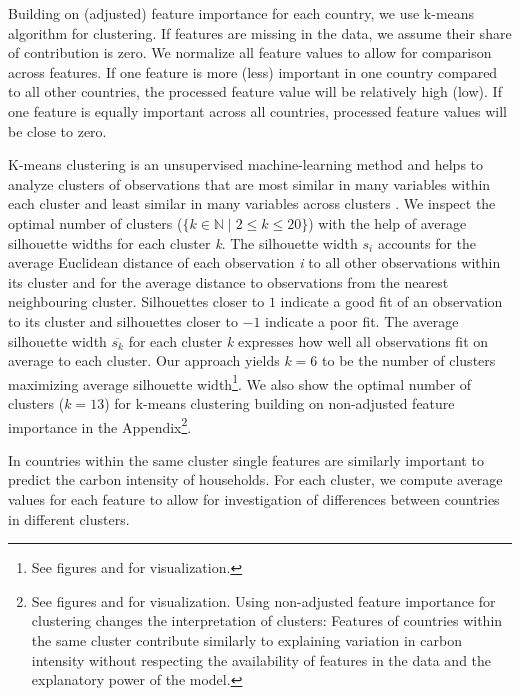 \documentclass[12pt, a4paper]{article}
\begin{document}
Building on (adjusted) feature importance for each country, we use k-means algorithm for clustering. If features are missing in the data, we assume their share of contribution is zero. We normalize all feature values to allow for comparison across features. If one feature is more (less) important in one country compared to all other countries, the processed feature value will be relatively high (low). If one feature is equally important across all countries, processed feature values will be close to zero.

K-means clustering is an unsupervised machine-learning method and helps to analyze clusters of observations that are most similar in many variables within each cluster and least similar in many variables across clusters \autocite{MacQueen.1967}. We inspect the optimal number of clusters ($\{k \in \mathbb{N} \mid 2  \leq k \leq 20 \}$) with the help of average silhouette widths \autocite{Rousseeuw.1987} for each cluster \textit{k}. The silhouette width $s_{i}$ accounts for the average Euclidean distance of each observation \textit{i} to all other observations within its cluster and for the average distance to observations from the nearest neighbouring cluster. Silhouettes closer to $1$ indicate a good fit of an observation to its cluster and silhouettes closer to $-1$ indicate a poor fit. The average silhouette width $\overline{s_{k}}$ for each cluster \textit{k} expresses how well all observations fit on average to each cluster. Our approach yields $k = 6$ to be the number of clusters maximizing average silhouette width\footnote{See figures and  for visualization.}. We also show the optimal number of clusters ($k = 13$) for k-means clustering building on non-adjusted feature importance in the Appendix\footnote{See figures  and  for visualization. Using non-adjusted feature importance for clustering changes the interpretation of clusters: Features of countries within the same cluster contribute similarly to explaining variation in carbon intensity without respecting the availability of features in the data and the explanatory power of the model.}.

In countries within the same cluster single features are similarly important to predict the carbon intensity of households. For each cluster, we compute average values for each feature to allow for investigation of differences between countries in different clusters.%
\end{document}
